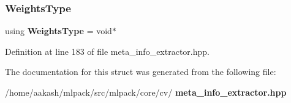 \subsubsection{Weights\+Type}
{\footnotesize\ttfamily using \textbf{ Weights\+Type} =  void$\ast$}



Definition at line 183 of file meta\+\_\+info\+\_\+extractor.\+hpp.



The documentation for this struct was generated from the following file\+:\begin{DoxyCompactItemize}
\item 
/home/aakash/mlpack/src/mlpack/core/cv/\textbf{ meta\+\_\+info\+\_\+extractor.\+hpp}\end{DoxyCompactItemize}
